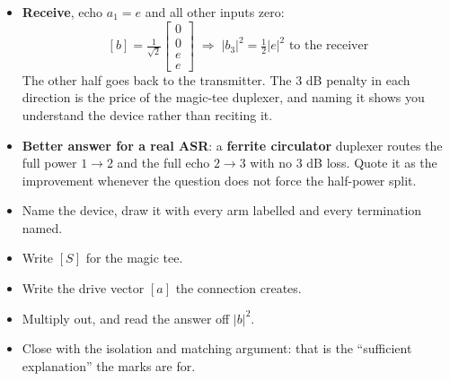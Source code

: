 {
\begin{itemize}
  \item \textbf{Receive}, echo $a_1 = e$ and all other inputs zero:
    \[ [b] = \tfrac{1}{\sqrt{2}}\begin{bmatrix} 0\\ 0\\ e\\ e \end{bmatrix}
       \;\Rightarrow\; |b_3|^2 = \tfrac{1}{2}|e|^2 \text{ to the receiver} \]
    The other half goes back to the transmitter. The $3$ dB penalty in each direction is
    the price of the magic-tee duplexer, and naming it shows you understand the device
    rather than reciting it.
  \item \textbf{Better answer for a real ASR}: a \textbf{ferrite circulator} duplexer
    routes the full power $1 \rightarrow 2$ and the full echo $2 \rightarrow 3$ with no
    $3$ dB loss. Quote it as the improvement whenever the question does not force the
    half-power split.
\end{itemize}
\begin{itemize}
  \item Name the device, draw it with every arm labelled and every termination named.
  \item Write $[S]$ for the magic tee.
  \item Write the drive vector $[a]$ the connection creates.
  \item Multiply out, and read the answer off $|b|^2$.
  \item Close with the isolation and matching argument: that is the ``sufficient
    explanation'' the marks are for.
\end{itemize}}

\vspace{3pt}

